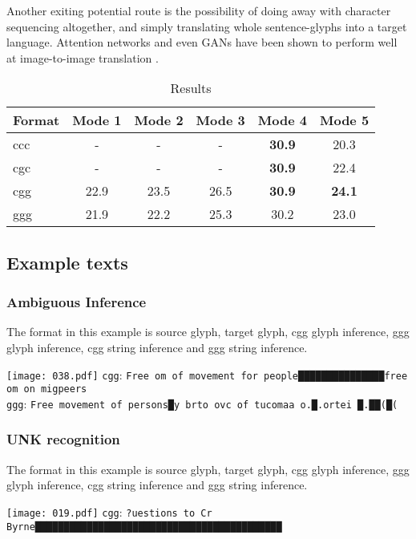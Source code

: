 \documentclass{article}
\begin{document}
Another exiting potential route is the possibility of doing away with character sequencing altogether, and simply translating whole sentence-glyphs into a target language. Attention networks and even GANs have been shown to perform well at image-to-image translation \cite{imagetrans}.

\begin{table}
  \centering
  \caption{Results}
  \begin{tabular}{lccccc}
    \toprule
    \cmidrule(r){1-2}
    Format  & Mode 1 & Mode 2 & Mode 3 & Mode 4 & Mode 5\\ 
    \midrule
    ccc     & -  & - & - & {\bf 30.9} & 20.3 \\
    cgc     & - & - & - & {\bf 30.9} & 22.4  \\
    cgg     & 22.9 & 23.5 & 26.5 & {\bf 30.9} & {\bf 24.1} \\
    ggg     & 21.9 & 22.2 & 25.3 & 30.2 & 23.0 \\
    \bottomrule
  \end{tabular}
  \label{tab:table2}
\end{table}

\subsection{Example texts}
\subsubsection{Ambiguous Inference}
The format in this example is source glyph, target glyph, cgg glyph inference, ggg glyph inference, cgg string inference and ggg string inference.

\vspace{1.2em}\noindent\texttt{[image: 038.pdf]}
\texttt{cgg}: \texttt{Free om of movement for people███████████████free om on migpeers}\\
\texttt{ggg}: \texttt{Free movement of persons█y brto ovc of tucomaa o.█.ortei █.██(█(}\\
\vspace{-0.8em}

\subsubsection{UNK recognition}
The format in this example is source glyph, target glyph, cgg glyph inference, ggg glyph inference, cgg string inference and ggg string inference.

\vspace{1.2em}\noindent\texttt{[image: 019.pdf]}
\texttt{cgg}: \texttt{?uestions to Cr Byrne███████████████████████████████████████████}\\
  
\end{document}

